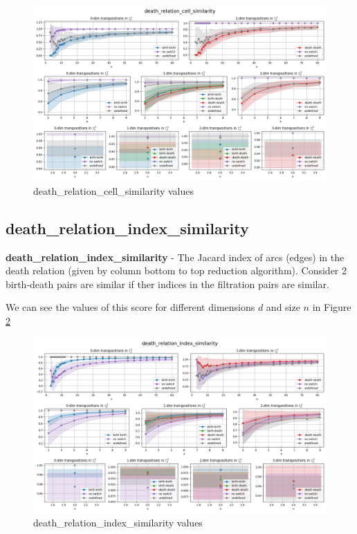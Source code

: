 \documentclass{article}
\begin{document}
\begin{figure}[h!]
    \centering
    \includegraphics[width=1.3\textwidth]{pics/torus-transpositions/similaritites/score=death-relation-cell-similarity.png}
    \caption{death\_relation\_cell\_similarity values}
    \label{fig:death-relation-cell-similarity}
\end{figure}

\subsection{death\_relation\_index\_similarity}
\par \textbf{death\_relation\_index\_similarity} - The Jacard index of arcs (edges) in the death relation (given by column bottom to top reduction algorithm).
    Consider 2 birth-death pairs are similar if ther indices in the filtration pairs are similar.
\par We can see the values of this score for different dimensions $d$ and size $n$ in Figure \ref{fig:death-relation-index-similarity}

\begin{figure}[h!]
    \centering
    \includegraphics[width=1.3\textwidth]{pics/torus-transpositions/similaritites/score=death-relation-index-similarity.png}
    \caption{death\_relation\_index\_similarity values}
    \label{fig:death-relation-index-similarity}
\end{figure}
\end{document}
